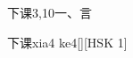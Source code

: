 \begin{entry}{下课}{3,10}{⼀、⾔}
  \begin{phonetics}{下课}{xia4 ke4}[][HSK 1]
  \end{phonetics}
\end{entry}
